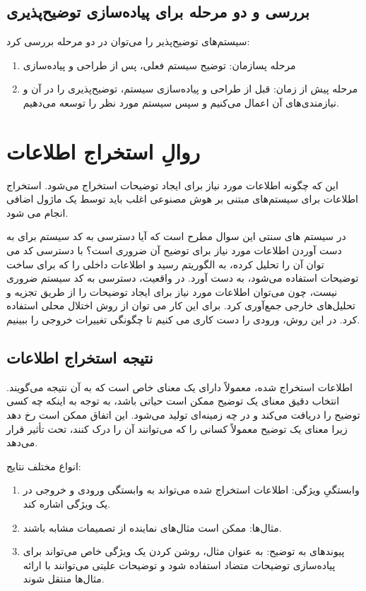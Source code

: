 \subsection{بررسی و دو مرحله برای پیاده‌سازی توضیح‌پذیری}

سیستم‌های توضیح‌پذیر را می‌توان در دو مرحله بررسی کرد:

\begin{enumerate}
    \item مرحله پسازمان: توضیح سیستم فعلی، پس از طراحی و پیاده‌سازی
    \item مرحله پیش از زمان: قبل از طراحی و پیاده‌سازی سیستم، توضیح‌پذیری را در
    آن و نیازمندی‌های آن اعمال می‌کنیم و سپس سیستم مورد نظر را توسعه می‌دهیم.
\end{enumerate}

\section{روالِ استخراج اطلاعات}

این که چگونه اطلاعات مورد نیاز برای ایجاد توضیحات استخراج می‌شود. استخراج
اطلاعات برای سیستم‌های مبتنی بر هوش مصنوعی اغلب باید توسط یک ماژول اضافی انجام
می شود.

در سیستم های سنتی این سوال مطرح است که آیا دسترسی به کد سیستم برای به دست آوردن
اطلاعات مورد نیاز برای توضیح آن ضروری است؟ با دسترسی کد می توان آن را تحلیل
کرده، به الگوریتم رسید و اطلاعات داخلی را که برای ساخت توضیحات استفاده می‌شود،
به دست آورد.  در واقعیت، دسترسی به کد سیستم ضروری نیست، چون می‌توان اطلاعات مورد
نیاز برای ایجاد توضیحات را از طریق تجزیه و تحلیل‌های خارجی جمع‌آوری کرد. برای
این کار می توان از روش اختلال محلی استفاده کرد. در این روش، ورودی را دست کاری می
کنیم تا چگونگی تغییرات خروجی را ببینیم.

\subsection{نتیجه استخراج اطلاعات}

اطلاعات استخراج شده، معمولاً دارای یک معنای خاص است که به آن نتیجه می‌گویند.
انتخاب دقیق معنای یک توضیح ممکن است حیاتی باشد، به توجه به اینکه چه کسی توضیح را
دریافت می‌کند و در چه زمینه‌ای تولید می‌شود. این اتفاق ممکن است رخ دهد زیرا
معنای یک توضیح معمولاً کسانی را که می‌توانند آن را درک کنند، تحت تأثیر قرار
می‌دهد.

انواع مختلف نتایج:

\begin{enumerate}
    \item وابستگیِ ویژگی: اطلاعات استخراج شده می‌تواند به وابستگی ورودی و خروجی
    در یک ویژگی اشاره کند. 
    \item مثال‌ها: ممکن است مثال‌های نماینده از تصمیمات مشابه باشند.
    \item پیوندهای به توضیح: به عنوان مثال، روشن کردن یک ویژگی خاص می‌تواند برای
    پیاده‌سازی توضیحات متضاد استفاده شود و توضیحات علیتی می‌توانند با ارائه
    مثال‌ها منتقل شوند.
\end{enumerate}

